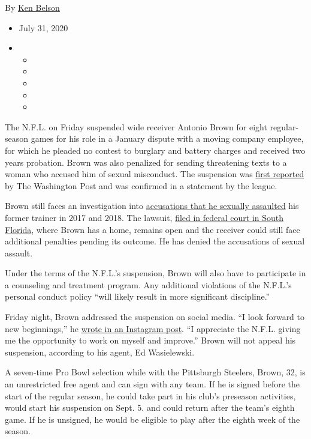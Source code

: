 By \href{https://www.nytimes3xbfgragh.onion/by/ken-belson}{Ken Belson}

\begin{itemize}
\item
  July 31, 2020
\item
  \begin{itemize}
  \item
  \item
  \item
  \item
  \item
  \end{itemize}
\end{itemize}

The N.F.L. on Friday suspended wide receiver Antonio Brown for eight
regular-season games for his role in a January dispute with a moving
company employee, for which he pleaded no contest to burglary and
battery charges and received two years probation. Brown was also
penalized for sending threatening texts to a woman who accused him of
sexual misconduct. The suspension was
\href{https://twitter.com/RobertKlemko/status/1289272211207929856}{first
reported} by The Washington Post and was confirmed in a statement by the
league.

Brown still faces an investigation into
\href{https://www.nytimes3xbfgragh.onion/2019/09/10/sports/football/antonio-brown-sexual-asssault-patriots.html}{accusations
that he sexually assaulted} his former trainer in 2017 and 2018. The
lawsuit,
\href{https://www.nytimes3xbfgragh.onion/2019/09/10/sports/football/antonio-brown-sexual-asssault-patriots.html}{filed
in federal court in South Florida}, where Brown has a home, remains open
and the receiver could still face additional penalties pending its
outcome. He has denied the accusations of sexual assault.

Under the terms of the N.F.L.'s suspension, Brown will also have to
participate in a counseling and treatment program. Any additional
violations of the N.F.L.'s personal conduct policy ``will likely result
in more significant discipline.''

Friday night, Brown addressed the suspension on social media. ``I look
forward to new beginnings,'' he
\href{https://www.instagram.com/p/CDVCrkeBb1w/}{wrote in an Instagram
post}. ``I appreciate the N.F.L. giving me the opportunity to work on
myself and improve.'' Brown will not appeal his suspension, according to
his agent, Ed Wasielewski.

A seven-time Pro Bowl selection while with the Pittsburgh Steelers,
Brown, 32, is an unrestricted free agent and can sign with any team. If
he is signed before the start of the regular season, he could take part
in his club's preseason activities, would start his suspension on Sept.
5. and could return after the team's eighth game. If he is unsigned, he
would be eligible to play after the eighth week of the season.

